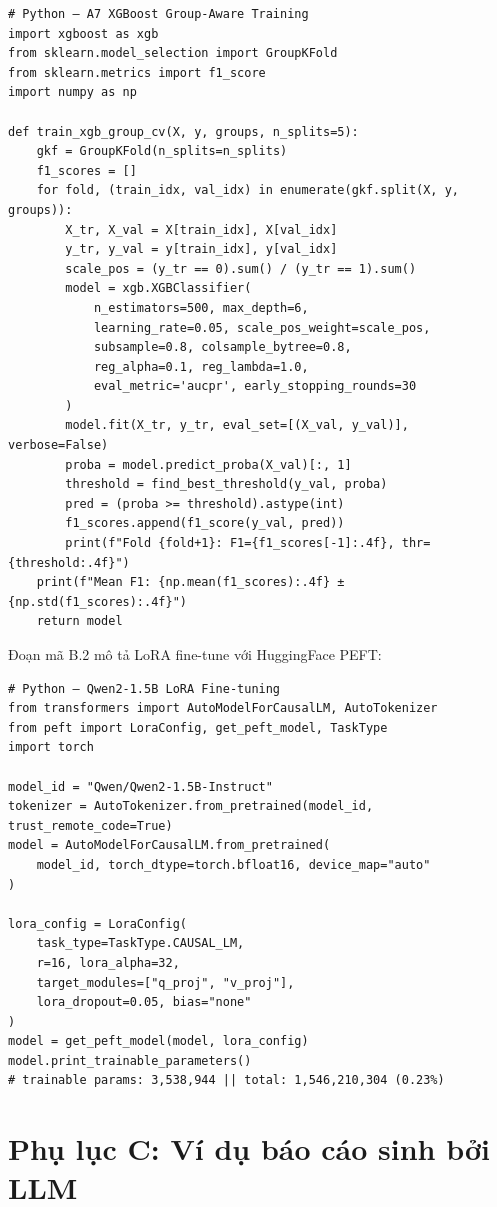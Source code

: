 \begin{verbatim}
# Python – A7 XGBoost Group-Aware Training
import xgboost as xgb
from sklearn.model_selection import GroupKFold
from sklearn.metrics import f1_score
import numpy as np

def train_xgb_group_cv(X, y, groups, n_splits=5):
    gkf = GroupKFold(n_splits=n_splits)
    f1_scores = []
    for fold, (train_idx, val_idx) in enumerate(gkf.split(X, y, groups)):
        X_tr, X_val = X[train_idx], X[val_idx]
        y_tr, y_val = y[train_idx], y[val_idx]
        scale_pos = (y_tr == 0).sum() / (y_tr == 1).sum()
        model = xgb.XGBClassifier(
            n_estimators=500, max_depth=6,
            learning_rate=0.05, scale_pos_weight=scale_pos,
            subsample=0.8, colsample_bytree=0.8,
            reg_alpha=0.1, reg_lambda=1.0,
            eval_metric='aucpr', early_stopping_rounds=30
        )
        model.fit(X_tr, y_tr, eval_set=[(X_val, y_val)], verbose=False)
        proba = model.predict_proba(X_val)[:, 1]
        threshold = find_best_threshold(y_val, proba)
        pred = (proba >= threshold).astype(int)
        f1_scores.append(f1_score(y_val, pred))
        print(f"Fold {fold+1}: F1={f1_scores[-1]:.4f}, thr={threshold:.4f}")
    print(f"Mean F1: {np.mean(f1_scores):.4f} ± {np.std(f1_scores):.4f}")
    return model
\end{verbatim}

Đoạn mã B.2 mô tả LoRA fine-tune với HuggingFace PEFT:

\begin{verbatim}
# Python – Qwen2-1.5B LoRA Fine-tuning
from transformers import AutoModelForCausalLM, AutoTokenizer
from peft import LoraConfig, get_peft_model, TaskType
import torch

model_id = "Qwen/Qwen2-1.5B-Instruct"
tokenizer = AutoTokenizer.from_pretrained(model_id, trust_remote_code=True)
model = AutoModelForCausalLM.from_pretrained(
    model_id, torch_dtype=torch.bfloat16, device_map="auto"
)

lora_config = LoraConfig(
    task_type=TaskType.CAUSAL_LM,
    r=16, lora_alpha=32,
    target_modules=["q_proj", "v_proj"],
    lora_dropout=0.05, bias="none"
)
model = get_peft_model(model, lora_config)
model.print_trainable_parameters()
# trainable params: 3,538,944 || total: 1,546,210,304 (0.23%)
\end{verbatim}

\section*{Phụ lục C: Ví dụ báo cáo sinh bởi LLM}

